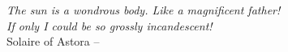 \thispagestyle{empty}

\vspace*{2cm}

\begin{flushright} \large
  {\itshape
  The sun is a wondrous body. Like a magnificent father!\\
  If only I could be so grossly incandescent!}\\
  Solaire of Astora --
\end{flushright}

